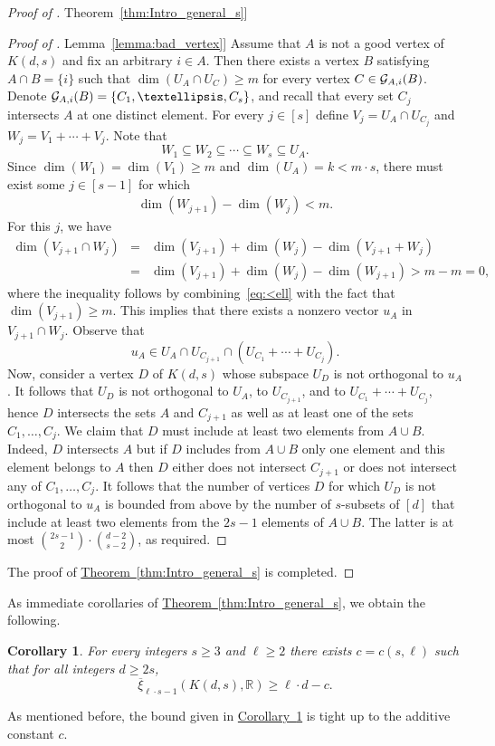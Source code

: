 \documentclass[11pt]{article}
\numberwithin{equation}{section}
\newtheorem{corollary}[theorem]{Corollary}
\theoremstyle{definition}
\theoremstyle{plain}
\newcommand{\R}{\mathbb R}
\newcommand{\expref}[2]{\hyperref[#2]{#1~\ref{#2}}}
\newcommand{\od}{\overline{\xi}}
\newcommand{\calG}{{\cal G}}
\begin{document}
\begin{proof}[Proof of \expref{Theorem}{thm:Intro_general_s}]
\begin{proof}[Proof of \expref{Lemma}{lemma:bad_vertex}]
Assume that $A$ is not a good vertex of $K(d,s)$ and fix an arbitrary $i \in A$. Then there exists a vertex $B$ satisfying $A \cap B = \{i\}$ such that $\dim(U_A \cap U_C) \geq m$ for every vertex $C \in \calG_{A,i}(B)$.
Denote $\calG_{A,i}(B) = \{C_1,\ldots,C_s\}$, and recall that every set $C_j$ intersects $A$ at one distinct element. For every $j \in [s]$ define $V_j = U_A \cap U_{C_j}$ and $W_j = V_1 + \cdots + V_j$. Note that
\[W_1 \subseteq W_2 \subseteq \cdots \subseteq W_s \subseteq U_A.\]
Since $\dim(W_1) = \dim(V_1) \geq m$ and $\dim(U_A)= k < m \cdot s$, there must exist some $j \in [s-1]$ for which
\begin{eqnarray}\label{eq:<ell}
\dim(W_{j+1}) - \dim(W_j) < m.
\end{eqnarray}
For this $j$, we have
\begin{eqnarray*}
\dim(V_{j+1} \cap W_j) &=& \dim(V_{j+1})+ \dim(W_j)- \dim(V_{j+1}+W_j)
\\ &=& \dim(V_{j+1})+ \dim(W_j) - \dim(W_{j+1}) > m-m=0,
\end{eqnarray*}
where the inequality follows by combining~\eqref{eq:<ell} with the fact that $\dim(V_{j+1}) \geq m$.
This implies that there exists a nonzero vector $u_A$ in $V_{j+1} \cap W_j$.
Observe that
\[u_A \in U_A \cap U_{C_{j+1}} \cap (U_{C_1} +\cdots+U_{C_j}).\]
Now, consider a vertex $D$ of $K(d,s)$ whose subspace $U_D$ is not orthogonal to $u_A$.
It follows that $U_D$ is not orthogonal to $U_A$, to $U_{C_{j+1}}$, and to $U_{C_1} +\cdots+U_{C_j}$, hence $D$ intersects the sets $A$ and $C_{j+1}$ as well as at least one of the sets $C_1,\ldots,C_{j}$.
We claim that $D$ must include at least two elements from $A \cup B$.
Indeed, $D$ intersects $A$ but if $D$ includes from $A \cup B$ only one element and this element belongs to $A$ then $D$ either does not intersect $C_{j+1}$ or does not intersect any of $C_1,\ldots,C_{j}$.
It follows that the number of vertices $D$ for which $U_D$ is not orthogonal to $u_A$ is bounded from above by the number of $s$-subsets of $[d]$ that include at least two elements from the $2s-1$ elements of $A \cup B$. The latter is at most $\binom{2s-1}{2} \cdot \binom{d-2}{s-2}$, as required.
\end{proof}
The proof
of \expref{Theorem}{thm:Intro_general_s}  %
is completed.
\end{proof}

As immediate corollaries of \expref{Theorem}{thm:Intro_general_s}, we obtain the following.
\begin{corollary}\label{cor:ls-1}
For every integers $s \geq 3$ and $\ell \geq 2$ there exists $c=c(s,\ell)$ such that for all integers $d \geq 2s$,
\[\od_{\ell \cdot s-1}(K(d,s),\R) \geq \ell \cdot d-c.\]
\end{corollary}
\noindent
As mentioned before, the bound given in \expref{Corollary}{cor:ls-1} is tight up to the additive constant $c$.
\end{document}
